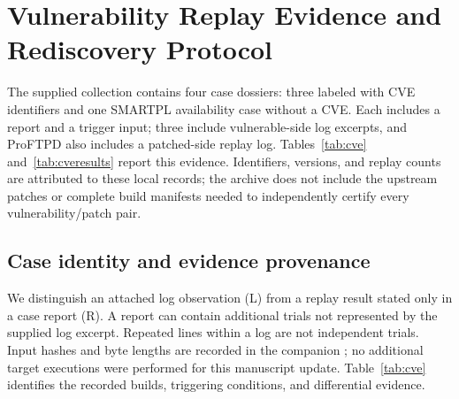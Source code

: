 \documentclass[final,5p,times,number]{elsarticle}
\begin{document}
\section{Vulnerability Replay Evidence and Rediscovery Protocol}
\label{sec:cve}
The supplied  collection contains four case dossiers: three labeled with CVE identifiers and one SMARTPL availability case without a CVE. Each includes a report and a trigger input; three include vulnerable-side log excerpts, and ProFTPD also includes a patched-side replay log. Tables~\ref{tab:cve} and~\ref{tab:cveresults} report this evidence. Identifiers, versions, and replay counts are attributed to these local records; the archive does not include the upstream patches or complete build manifests needed to independently certify every vulnerability/patch pair.

\subsection{Case identity and evidence provenance}
We distinguish an attached log observation (L) from a replay result stated only in a case report (R). A report can contain additional trials not represented by the supplied log excerpt. Repeated lines within a log are not independent trials. Input hashes and byte lengths are recorded in the companion ; no additional target executions were performed for this manuscript update. Table~\ref{tab:cve} identifies the recorded builds, triggering conditions, and differential evidence.
\end{document}
